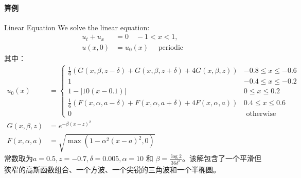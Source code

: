 \documentclass{book}
\begin{document}
\paragraph{算例}

\begin{example}{Linear Equation}{}
    We solve the linear equation\cite{RN56}:
    \begin{equation}
        \begin{aligned}
            u_{t}+u_{x} & =0 \quad-1<x<1,                    \\
            u(x, 0)     & =u_{0}(x) \quad \text { periodic }
        \end{aligned}
    \end{equation}
    其中：
    \begin{equation}
        \begin{aligned}
            u_{0}(x)        & =\begin{cases}
                                   \frac{1}{6}(G(x, \beta, z-\delta)+G(x, \beta, z+\delta)+4 G(x, \beta, z))    & -0.8 \leq x \leq-0.6 \\
                                   1                                                                            & -0.4 \leq x \leq-0.2 \\
                                   1-|10(x-0.1)|                                                                & 0 \leq x \leq 0.2    \\
                                   \frac{1}{6}(F(x, \alpha, a-\delta)+F(x, \alpha, a+\delta)+4 F(x, \alpha, a)) & 0.4 \leq x \leq 0.6  \\
                                   0                                                                            & \text { otherwise }
                               \end{cases} \\
            G(x, \beta, z)  & =e^{-\beta(x-z)^{2}}                                                                                 \\
            F(x, \alpha, a) & =\sqrt{\max \left(1-\alpha^{2}(x-a)^{2}, 0\right)}
        \end{aligned}
    \end{equation}
    常数取为$a=0.5, z=-0.7, \delta=0.005, \alpha=10$ 和 $\beta=\frac{\log 2}{36 \delta^{2}}$。该解包含了一个平滑但狭窄的高斯函数组合、一个方波、一个尖锐的三角波和一个半椭圆。
\end{example}
\end{document}
